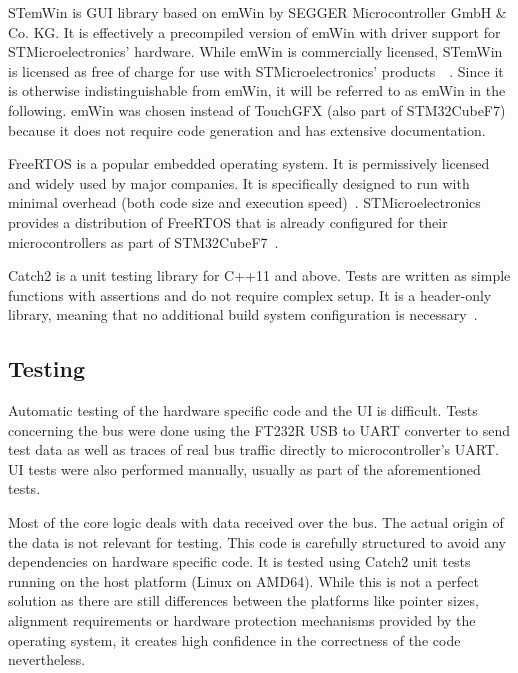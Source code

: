 STemWin is GUI library based on emWin by SEGGER Microcontroller GmbH \& Co. KG. It is effectively
a precompiled version of emWin with driver support for STMicroelectronics' hardware. While emWin is
commercially licensed, STemWin is licensed as free of charge for use with STMicroelectronics' products~\
\cite{stm32-cube-getting-started}\cite{stemwin-release-notes}\cite{emwin-manual}. Since it is otherwise
indistinguishable from emWin, it will be referred to as emWin in the following. emWin was chosen instead
of TouchGFX (also part of STM32CubeF7) because it does not require code generation and has extensive
documentation.

FreeRTOS is a popular embedded operating system. It is permissively licensed and widely used by major
companies. It is specifically designed to run with minimal overhead (both code size and execution
speed)~\cite{freertos-about}. STMicroelectronics provides a distribution of FreeRTOS that is already
configured for their microcontrollers as part of STM32CubeF7~\cite{stm32-cube-getting-started}.

Catch2 is a unit testing library for C++11 and above. Tests are written as simple functions with
assertions and do not require complex setup. It is a header-only library, meaning that no additional
build system configuration is necessary~\cite{catch2-why}.

\subsection{Testing}
\label{implementation/software/testing}

Automatic testing of the hardware specific code and the UI is difficult. Tests concerning the bus
were done using the FT232R USB to UART converter to send test data as well as traces of real bus
traffic directly to microcontroller's UART. UI tests were also performed manually, usually as part
of the aforementioned tests.

Most of the core logic deals with data received over the bus. The actual origin of the data is not
relevant for testing. This code is carefully structured to avoid any dependencies on hardware 
specific code. It is tested using Catch2 unit tests running on the host platform (Linux on AMD64).
While this is not a perfect solution as there are still differences between the platforms like pointer
sizes, alignment requirements or hardware protection mechanisms provided by the operating system,
it creates high confidence in the correctness of the code nevertheless.

